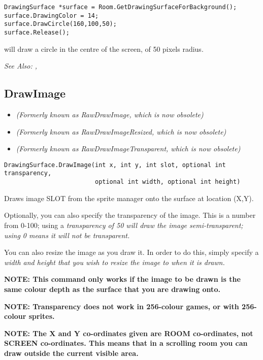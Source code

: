 \begin{verbatim}
DrawingSurface *surface = Room.GetDrawingSurfaceForBackground();
surface.DrawingColor = 14;
surface.DrawCircle(160,100,50);
surface.Release();
\end{verbatim}
will draw a circle in the centre of the screen, of 50 pixels radius.

\it{See Also:} ,


\subsection{DrawImage}\label{DrawingSurface.DrawImage}%

\begin{itemize}
\item \it{(Formerly known as RawDrawImage, which is now obsolete)}
\item \it{(Formerly known as RawDrawImageResized, which is now obsolete)}
\item \it{(Formerly known as RawDrawImageTransparent, which is now obsolete)}
\end{itemize}

\begin{verbatim}
DrawingSurface.DrawImage(int x, int y, int slot, optional int transparency,
                         optional int width, optional int height)
\end{verbatim}
Draws image SLOT from the sprite manager onto the surface at location (X,Y).

Optionally, you can also specify the transparency of the image. This is a number
from 0-100; using a \it{transparency} of 50 will draw the image semi-transparent;
using 0 means it will not be transparent.

You can also resize the image as you draw it. In order to do this, simply specify
a \it{width} and \it{height} that you wish to resize the image to when it is drawn.

\bf{NOTE:} This command only works if the image to be drawn is the same colour
depth as the surface that you are drawing onto.

\bf{NOTE:} Transparency does not work in 256-colour games, or with 256-colour sprites.

\bf{NOTE:} The X and Y co-ordinates given are ROOM co-ordinates, not SCREEN co-ordinates.
This means that in a scrolling room you can draw outside the current visible area.


